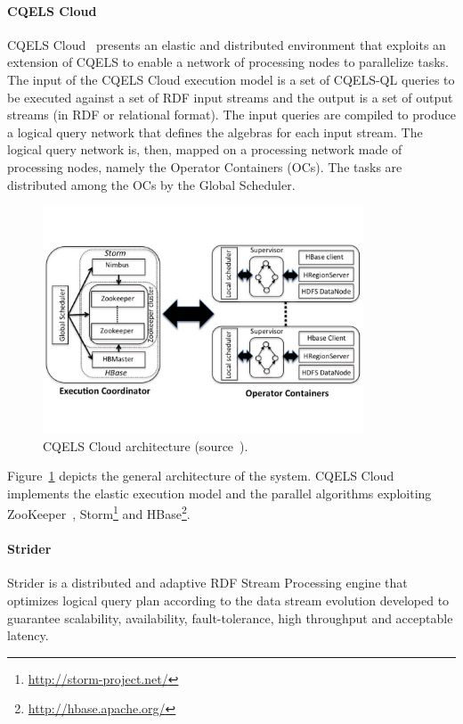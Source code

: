 \paragraph{CQELS Cloud}
CQELS Cloud~\cite{DBLP:conf/semweb/PhuocQVH13} presents an elastic and distributed environment that exploits an extension of CQELS to enable a network of processing nodes to parallelize tasks.
The input of the CQELS Cloud execution model is a set of CQELS-QL queries to be executed against a set of RDF input streams and the output is a set of output streams (in RDF or relational format).
The input queries are compiled to produce a logical query network that defines the algebras for each input stream. The logical query network is, then, mapped on a processing network made of processing nodes, namely the Operator Containers (OCs). The tasks are distributed among the OCs by the Global Scheduler.

\begin{figure}[h]
\begin{center}
\includegraphics[width=0.85\textwidth]{img/cqels-cloud}
\caption{CQELS Cloud architecture (source~\cite{DBLP:conf/semweb/PhuocQVH13}).}
\label{fig:cqels-cloud}
\end{center}
\end{figure}

Figure~\ref{fig:cqels-cloud} depicts the general architecture of the system. CQELS Cloud implements the elastic execution model and the parallel algorithms exploiting ZooKeeper~\cite{DBLP:conf/usenix/HuntKJR10}, Storm\footnote{\url{http://storm-project.net/}} and HBase\footnote{\url{http://hbase.apache.org/}}. 

\paragraph{Strider}
Strider \cite{DBLP:conf/semweb/RenC17} is a distributed and adaptive RDF Stream Processing engine that optimizes logical query plan according to the data stream evolution developed to guarantee scalability, availability, fault-tolerance, high throughput and acceptable latency. 

